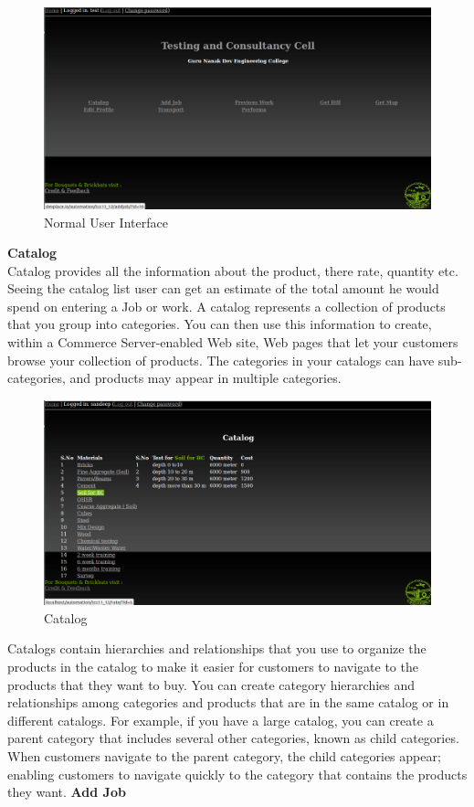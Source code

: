 \begin{figure}[h]
\vskip 2cm
\centering \includegraphics[scale=1.0]{images/user2.png}
\caption{Normal User Interface}
\end{figure}
\newpage
{\bf Catalog}\\
Catalog provides all the information about the product, there rate, 
quantity etc. Seeing the catalog list user can get an estimate of the 
total amount he would spend on entering a Job or work. A catalog 
represents a collection of products that you group into categories. 
You can then use this information to create, within a Commerce 
Server-enabled Web site, Web pages that let your customers browse your 
collection of products. The categories in your catalogs can have 
sub-categories, and products may appear in multiple categories.\\


\begin{figure}[h]
\centering \includegraphics[scale=1.0]{images/Catalog.png}
\caption{Catalog}
\end{figure}

Catalogs contain hierarchies and relationships that you use to organize 
the products in the catalog to make it easier for customers to navigate 
to the products that they want to buy. You can create category 
hierarchies and relationships among categories and products that are 
in the same catalog or in different catalogs. For example, if you have 
a large catalog, you can create a parent category that includes several 
other categories, known as child categories. When customers navigate to 
the parent category, the child categories appear; enabling customers to 
navigate quickly to the category that contains the products they want.
\newpage
{\bf Add Job}\\

